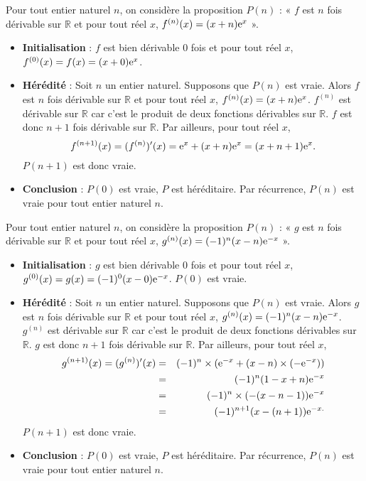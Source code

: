 \documentclass[11pt,fleqn]{book} %
\begin{document}
\begin{solution}Pour tout entier naturel \(n\), on considère la proposition \(P(n)\) : « \(f\) est \(n\) fois dérivable sur \(\mathbb{R}\) et pour tout réel \(x\), \(f^{(n)}(x)=(x+n)\mathrm{e}^x\) ».
\begin{itemize}
\item \textbf{Initialisation} : \(f\) est bien dérivable 0 fois et pour tout réel \(x\), \(f^{(0)}(x)=f(x)=(x+0)\mathrm{e}^x\).
\item\textbf{ Hérédité} : Soit \(n\) un entier naturel. Supposons que \(P(n)\) est vraie. Alors \(f\) est \(n\) fois dérivable sur \(\mathbb{R}\) et pour tout réel \(x\), \(f^{(n)}(x)=(x+n)\mathrm{e}^x\). \(f^{(n)}\) est dérivable sur \(\mathbb{R}\) car c'est le produit de deux fonctions dérivables sur \(\mathbb{R}\). \(f\) est donc \(n+1\) fois dérivable sur \(\mathbb{R}\). Par ailleurs, pour tout réel \(x\),
\[f^{(n+1)}(x) = (f^{(n)})'(x)=\mathrm{e}^x+(x+n)\mathrm{e}^x=(x+n+1)\mathrm{e}^x.\]
\(P(n+1)\) est donc vraie.
\item \textbf{Conclusion} : \(P(0)\) est vraie, \(P\) est héréditaire. Par récurrence, \(P(n)\) est vraie pour tout entier naturel \(n\).
\end{itemize}

Pour tout entier naturel \(n\), on considère la proposition \(P(n)\) : « \(g\) est \(n\) fois dérivable sur \(\mathbb{R}\) et pour tout réel \(x\), \(g^{(n)}(x)=(-1)^n (x-n)\mathrm{e}^{-x}\) ».
\begin{itemize}
\item \textbf{Initialisation} : \(g\) est bien dérivable 0 fois et pour tout réel \(x\), \(g^{(0)}(x)=g(x)=(-1)^0(x-0)\mathrm{e}^{-x}\). \(P(0)\) est vraie.
\item \textbf{Hérédité} : Soit \(n\) un entier naturel. Supposons que \(P(n)\) est vraie. Alors \(g\) est \(n\) fois dérivable sur \(\mathbb{R}\) et pour tout réel \(x\), \(g^{(n)}(x)=(-1)^n(x-n)\mathrm{e}^{-x}\). \(g^{(n)}\) est dérivable sur \(\mathbb{R}\) car c'est le produit de deux fonctions dérivables sur \(\mathbb{R}\). \(g\) est donc \(n+1\) fois dérivable sur \(\mathbb{R}\). Par ailleurs, pour tout réel \(x\),
\begin{eqnarray*}g^{(n+1)}(x) = (g^{(n)})'(x)&=&(-1)^n \times(\mathrm{e}^{-x}+(x-n)\times(-\mathrm{e}^{-x}))\\& =& (-1)^n (1-x+n) \mathrm{e}^{-x} \\&=&(-1)^n \times (-(x-n-1))\mathrm{e}^{-x}\\&=&(-1)^{n+1}(x-(n+1))\mathrm{e}^{-x.}\end{eqnarray*} 
\(P(n+1)\) est donc vraie.
\item \textbf{Conclusion} : \(P(0)\) est vraie, \(P\) est héréditaire. Par récurrence, \(P(n)\) est vraie pour tout entier naturel \(n\).
\end{itemize}
\end{solution}
\end{document}
